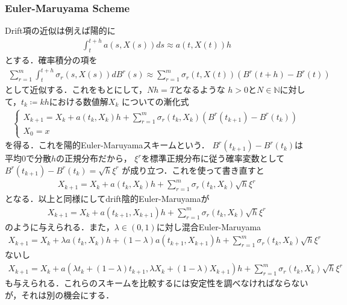\documentclass[dvipdfmx,autodetect-engine]{jsarticle}
\theoremstyle{remark}
\theoremstyle{definition}
\newcommand{\N}{\mathbb{N}}
\begin{document}
\subsubsection{Euler-Maruyama Scheme}
Drift項の近似は例えば陽的に
\begin{align}
    \int_{t}^{t+h} a(s,X(s))ds \approx a(t,X(t))h
\end{align}
とする．確率積分の項を
\begin{align}
    \sum_{r=1}^{m} \int_{t}^{t+h} \sigma_{r}(s,X(s))dB^{r}(s)
    \approx \sum_{r=1}^{m} \sigma_{r}(t,X(t)) (B^{r}(t+h) - B^{r}(t))
\end{align}
として近似する．これをもとにして，$Nh = T$となるような
$h>0$と$N \in \N$に対して，$t_{k}\coloneqq  kh$における数値解$X_{k}$
についての漸化式
\begin{align}
    \begin{cases}
        X_{k+1} = X_{k} + a(t_{k},X_{k})h 
        + \sum_{r=1}^{m} \sigma_{r}(t_{k},X_{k}) (B^{r}(t_{k+1}) - B^{r}(t_{k}))\\
        X_{0} = x
    \end{cases}
\end{align}
を得る．これを陽的Euler-Maruyamaスキームという．
$B^{r}(t_{k+1}) - B^{r}(t_{k})$は平均$0$で分散$h$の正規分布だから，
$\xi^{r}$を標準正規分布に従う確率変数として$B^{r}(t_{k+1}) - B^{r}(t_{k}) = \sqrt{h} \xi^{r}$
が成り立つ．これを使って書き直すと
\begin{align}
    X_{k+1} = X_{k} + a(t_{k},X_{k})h 
    + \sum_{r=1}^{m} \sigma_{r}(t_{k},X_{k}) \sqrt{h} \xi^{r} \label{Euler_Maruyama}
\end{align}
となる．以上と同様にしてdrift陰的Euler-Maruyamaが
\begin{align}
    X_{k+1} = X_{k} + a(t_{k+1},X_{k+1})h 
    + \sum_{r=1}^{m} \sigma_{r}(t_{k},X_{k}) \sqrt{h} \xi^{r}
\end{align}
のように与えられる．また，$\lambda \in (0,1)$に対し混合Euler-Maruyama
\begin{align}
    X_{k+1} = X_{k} + \lambda a(t_{k},X_{k})h + (1-\lambda) a(t_{k+1},X_{k+1})h 
    + \sum_{r=1}^{m} \sigma_{r}(t_{k},X_{k}) \sqrt{h} \xi^{r}
\end{align}
ないし
\begin{align}
    X_{k+1} = X_{k} + a(\lambda t_k + (1-\lambda)t_{k+1}, \lambda X_{k} + (1-\lambda)X_{k+1})h
    + \sum_{r=1}^{m} \sigma_{r}(t_{k},X_{k}) \sqrt{h} \xi^{r}
\end{align}
も与えられる．これらのスキームを比較するには安定性を調べなければならないが，それは別の機会にする．
\end{document}
